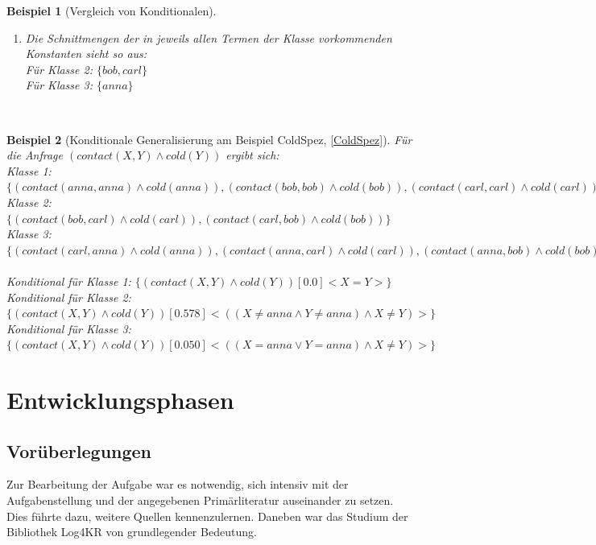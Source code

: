 \documentclass[a4paper, 11pt]{book}
\newtheorem{Bsp}{Beispiel}[section]
\begin{document}
{\begin{itemize}
\begin{Bsp}[Vergleich von Konditionalen]
\begin{enumerate}
 			Für Klasse 2: $ \{contact(bob,carl), contact(carl,bob)\}$ \\
 			Für Klasse 3: $ \{contact(carl,anna), contact(anna, carl), contact(anna,bob), contact(bob, anna) \}$ \\
 			\item Die Schnittmengen der in jeweils allen Termen der Klasse vorkommenden Konstanten sieht so aus:\\
 			Für Klasse 2: $ \{bob, carl\}$ \\
 			Für Klasse 3: $ \{anna\} $ 
 		\end{enumerate}\
	\end{Bsp}
		\begin{Bsp}[Konditionale Generalisierung am Beispiel ColdSpez, \ref{ColdSpez}]
			Für die Anfrage $ (contact(X,Y) \land cold(Y)) $ ergibt sich:\\
			Klasse 1: $ \{(contact(anna,anna) \land cold(anna)), (contact(bob,bob) \land cold(bob)), (contact(carl,carl) \land cold(carl)) \} $\\
			Klasse 2: $ \{(contact(bob,carl) \land cold(carl)), (contact(carl,bob) \land cold(bob)) \} $\\
			Klasse 3: $ \{(contact(carl,anna) \land cold(anna)), (contact(anna, carl) \land cold(carl)), (contact(anna,bob) \land cold(bob)), (contact(bob, anna) \land cold(anna)) \} $\\
			\\
			\noindent
			Konditional für Klasse 1: $ \{(contact(X,Y) \land cold(Y)) [0.0] <X = Y>\} $\\
			Konditional für Klasse 2: $ \{(contact(X,Y) \land cold(Y)) [0.578] <((X \neq anna \land Y \neq anna) \land X \neq Y)>\} $\\
			Konditional für Klasse 3: $ \{(contact(X,Y) \land cold(Y)) [0.050] <((X = anna \lor Y = anna)\land X \neq Y)>\} $	
		\end{Bsp}
\end{itemize}
}
\chapter{Entwicklungsphasen}\label{Dok}
\section{Vorüberlegungen}
Zur Bearbeitung der Aufgabe war es notwendig, sich intensiv mit der Aufgabenstellung und der angegebenen Primärliteratur auseinander zu setzen. Dies führte dazu, weitere Quellen kennenzulernen. Daneben war das Studium der Bibliothek Log4KR von grundlegender Bedeutung. 
\end{document}
